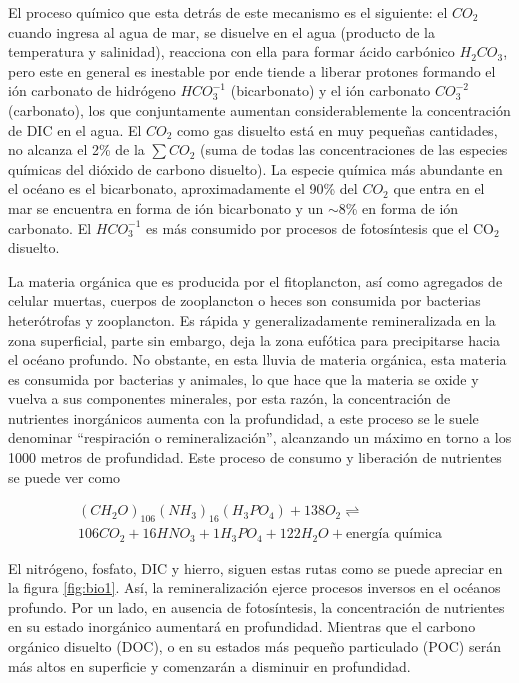 El proceso qu\'imico que esta detr\'as de este mecanismo es el siguiente: el $CO_2$ cuando ingresa al agua de mar, se disuelve en el agua (producto de la temperatura y salinidad), reacciona con ella para formar \'acido carb\'onico $H_{2}CO_{3}$, pero este en general es inestable por ende tiende a liberar protones formando el i\'on carbonato de hidr\'ogeno $HCO_{3}^{-1}$ (bicarbonato) y el i\'on carbonato $CO_{3}^{-2}$ (carbonato), los que conjuntamente aumentan considerablemente la concentraci\'on de DIC en el agua\citep{Turekiangeochemistry}. El $CO_2$ como gas disuelto est\'a en muy peque\~nas cantidades, no alcanza el 2\% de la $\sum CO_2$ (suma de todas las concentraciones de las especies químicas del dióxido de carbono disuelto). La especie qu\'imica m\'as abundante en el oc\'eano es el bicarbonato, aproximadamente el 90\% del $CO_2$ que entra en el mar se encuentra en forma de i\'on bicarbonato y un $\sim$8\% en forma de i\'on carbonato. El $HCO_{3}^{-1}$ es m\'as consumido por procesos de fotos\'intesis que el CO$_2$ disuelto.

La materia orgánica que es producida por el fitoplancton, así como agregados de celular muertas, cuerpos de zooplancton o heces son consumida por bacterias heterótrofas y zooplancton.  Es rápida y generalizadamente remineralizada en la zona superficial, parte sin embargo, deja la zona eufótica para precipitarse hacia el océano profundo. No obstante, en esta lluvia de materia orgánica, esta materia es consumida por bacterias y animales, lo que hace que la materia se oxide y vuelva a sus componentes minerales, por esta razón, la concentración de nutrientes inorgánicos aumenta con la profundidad, a este proceso se le suele denominar ``respiración o remineralización'', alcanzando un máximo en torno a los 1000 metros de profundidad. 
Este proceso de consumo y liberación de nutrientes se puede ver como

\begin{equation} \label{eq:marco1.4}
\begin{split}
(CH_{2}O)_{106}(NH_{3})_{16}(H_{3}PO_{4})  + 138O_{2} \rightleftharpoons \\
106CO_{2} + 16HNO_{3} + 1H_{3}PO_{4} +122H_{2}O+ \textrm{energía química} 
\end{split}
\end{equation}

El nitrógeno, fosfato, DIC y hierro, siguen estas rutas como se puede apreciar en la figura \ref{fig:bio1}. Así, la remineralización ejerce procesos inversos en el océanos profundo. Por un lado, en ausencia de fotosíntesis, la concentración de nutrientes en su estado inorgánico aumentará en profundidad. Mientras que el carbono orgánico disuelto (DOC), o en su estados más pequeño particulado (POC) serán más altos en superficie y comenzarán a disminuir en profundidad. 

